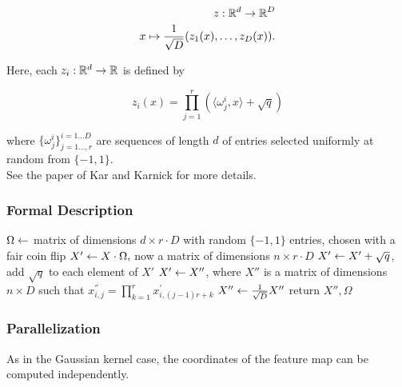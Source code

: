 \begin{align*}
z: \mathbb{R}^d\to \mathbb{R}^D\\
x\mapsto \frac{1}{\sqrt{D}} (z_1(x), \ldots, z_D(x)).
\end{align*}

Here, each $z_i:\mathbb{R}^d\to\mathbb{R}$ is defined by

\[z_i(x) = \prod_{j=1}^r (\langle \omega^i_{j}, x\rangle+\sqrt{q})\]

where $\{\omega^i_{j}\}^{i=1\ldots D}_{j=1\ldots,r}$ are sequences of length $d$ of entries selected uniformly at random from $\{-1,1\}$.\\

See the paper of Kar and Karnick \cite{KK12} for more details.


\subsubsection{Formal Description}

\begin{algorithm} 
\begin{algorithmic}[1]
	\State $\Omega \leftarrow $ matrix of dimensions $d\times r\cdot D$ with random $\{-1,1\}$ entries, chosen with a fair coin flip
	\State $X'\leftarrow X\cdot \Omega,$ now a matrix of dimensions $n\times r\cdot D$
	\State $X' \leftarrow X' + \sqrt{q}$, add $\sqrt{q}$ to each element of $X'$
	\State $X'\leftarrow X''$, where $X''$ is a matrix of dimensions $n\times D$ such that $x^{''}_{i,j} = \prod_{k=1}^r x^{'}_{i,(j-1)r + k}$
	\State $X'' \leftarrow \frac{1}{\sqrt{D}} X''$
	\State return $X'',\Omega$
\end{algorithmic}
\end{algorithm}

\subsubsection{Parallelization}
As in the Gaussian kernel case, the coordinates of the feature map can be computed independently.



